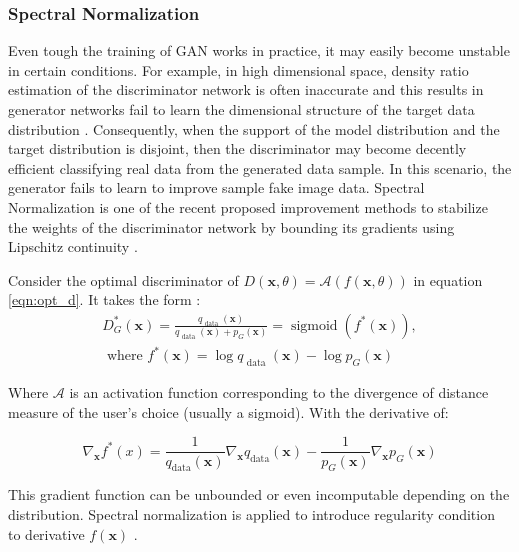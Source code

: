 {\subsubsection{Spectral Normalization}
\label{sec:alad_sn}

Even tough the training of GAN works in practice, it may easily become unstable in certain
conditions. For example, in high dimensional space, density ratio estimation of the discriminator
network is often inaccurate and this results in generator networks fail to learn the dimensional
structure of the target data distribution \cite{methods}. Consequently, when the support of the model
distribution and the target distribution is disjoint, then the discriminator may become decently
efficient classifying real data from the generated data sample. In this scenario, the generator
fails to learn to improve sample fake image data. Spectral Normalization is one of the recent
proposed improvement methods to stabilize the weights of the discriminator network by bounding its
gradients using Lipschitz continuity \cite{inproceedings_sn}. 

Consider the optimal discriminator of $D(\boldsymbol{x}, \theta)=\mathcal{A}(f(\boldsymbol{x}, \theta))$ in equation \ref{eqn:opt_d}. It takes the form :
\begin{multline}
    D_{G}^{*}(\boldsymbol{x})=\frac{q_{\text { data }}(\boldsymbol{x})}{q_{\text { data }}(\boldsymbol{x})+p_{G}(\boldsymbol{x})}=\operatorname{sigmoid}\left(f^{*}(\boldsymbol{x})\right), \\ \text { where } f^{*}(\boldsymbol{x})=\log q_{\text { data }}(\boldsymbol{x})-\log p_{G}(\boldsymbol{x}) 
\end{multline}

Where $\mathcal{A}$ is an activation function corresponding to the divergence of distance measure of the
user’s choice (usually a sigmoid). With the derivative of: 

\begin{equation}
    \nabla_{\boldsymbol{x}} f^{*}(x)=\frac{1}{q_{\mathrm{data}}(\boldsymbol{x})} \nabla_{\boldsymbol{x}} q_{\mathrm{data}}(\boldsymbol{x})-\frac{1}{p_{G}(\boldsymbol{x})} \nabla_{\boldsymbol{x}} p_{G}(\boldsymbol{x})  
\end{equation}

This gradient function can be unbounded or even incomputable depending on the distribution. Spectral
normalization is applied to introduce regularity condition to derivative $f(\boldsymbol{x})$
\cite{inproceedings_sn}.

}
